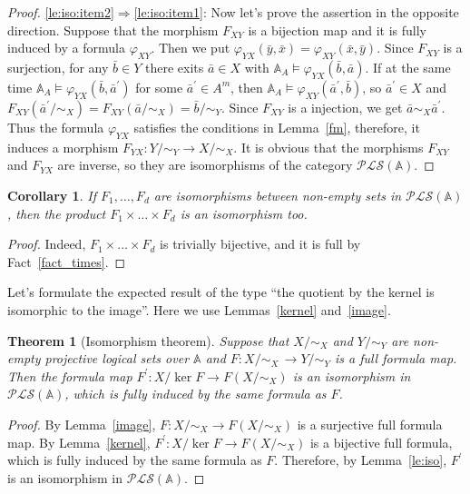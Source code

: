 \documentclass[12pt]{article}
\newtheorem{theorem}{Theorem}
\newtheorem{corollary}{Corollary}
\theoremstyle{definition}
\def\MA{{\mathbb{A}}}
\def\PLS{{\mathcal{PLS}}}
\begin{document}
\begin{proof}
\ref{le:iso:item2}$\Longrightarrow$\ref{le:iso:item1}: Now let's prove the assertion in the opposite direction. Suppose that the morphism $F_{XY}$ is a bijection map and it is fully induced by a formula $\varphi_{XY}$. Then we put $\varphi_{YX}(\bar y,\bar x)=\varphi_{XY}(\bar x,\bar y)$. Since $F_{XY}$ is a surjection, for any $\bar b\in Y$ there exits $\bar a\in X$ with $\MA_A\models\varphi_{YX}(\bar b, \bar a)$. If at the same time $\MA_A\models\varphi_{YX}(\bar b, \bar a^\prime)$ for some $\bar a^\prime\in A^m$, then $\MA_A\models\varphi_{XY}(\bar a^\prime, \bar b)$, so $\bar a^\prime \in X$ and $F_{XY}(\bar a^\prime/{\sim_X})=F_{XY}(\bar a/{\sim_X})=\bar b/{\sim_Y}$. Since $F_{XY}$ is a injection, we get $\bar a\sim_X \bar a^\prime$. Thus the formula $\varphi_{YX}$ satisfies the conditions in Lemma~\ref{fm}, therefore, it induces a morphism $F_{YX}\colon Y/{\sim_Y}\to X/{\sim_X}$. It is obvious that the morphisms $F_{XY}$ and $F_{YX}$ are inverse, so they are isomorphisms of the category $\PLS(\MA)$.
\end{proof}

\begin{corollary}
If $F_1,\ldots, F_d$ are isomorphisms between non-empty sets in $\PLS(\MA)$, then the product $F_1\times\ldots\times F_d$ is an isomorphism too.
\end{corollary}

\begin{proof}
Indeed, $F_1\times\ldots\times F_d$ is trivially bijective, and it is full by Fact~\ref{fact_times}.
\end{proof}

Let's formulate the expected result of the type ``the quotient by the kernel is isomorphic to the image''. Here we use Lemmas~\ref{kernel} and~\ref{image}.

\begin{theorem}[Isomorphism theorem]\label{th_hom}
Suppose that $X/{\sim_X}$ and $Y/{\sim_Y}$ are non-empty projective logical sets over $\MA$ and $F\colon X/{\sim_X} \,\to Y/{\sim_Y}$ is a full  formula map. Then the formula map $F^\prime\colon X/{\ker F}\to F(X/{\sim_X})$ is an isomorphism in $\PLS(\MA)$, which is fully induced by the same formula as $F$.
\end{theorem}

\begin{proof}
By Lemma~\ref{image}, $F\colon X/{\sim_X}\to F(X/{\sim_X})$ is a surjective full formula map. By Lemma~\ref{kernel}, $F^\prime\colon X/{\ker F}\to F(X/{\sim_X})$ is a bijective full formula, which is fully induced by the same formula as $F$. Therefore, by Lemma~\ref{le:iso}, $F^\prime$ is an isomorphism in $\PLS(\MA)$.
\end{proof}
\end{document}
